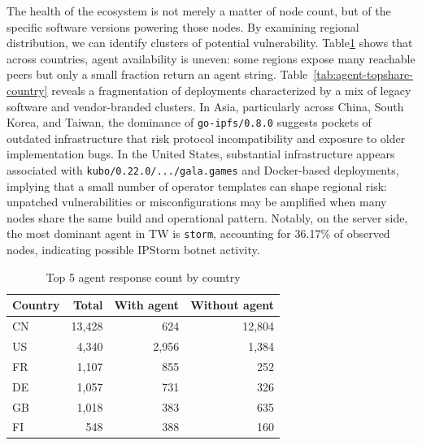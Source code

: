 \documentclass[10pt,a4paper,twocolumn]{article}
\begin{document}
The health of the ecosystem is not merely a matter of node count, but of the specific software versions powering those nodes. By examining regional distribution, we can identify clusters of potential vulnerability. Table\ref{tab:agent-coverage-country} shows that across countries, agent availability is uneven: some regions expose many reachable peers but only a small fraction return an agent string. Table~\ref{tab:agent-topshare-country} reveals a fragmentation of deployments characterized by a mix of legacy software and vendor-branded clusters. In Asia, particularly across China, South Korea, and Taiwan, the dominance of \texttt{go-ipfs/0.8.0} suggests pockets of outdated infrastructure that risk protocol incompatibility and exposure to older implementation bugs. In the United States, substantial infrastructure appears associated with \texttt{kubo/0.22.0/.../gala.games} and Docker-based deployments, implying that a small number of operator templates can shape regional risk: unpatched vulnerabilities or misconfigurations may be amplified when many nodes share the same build and operational pattern.
Notably, on the server side, the most dominant agent in TW is \texttt{storm}, accounting for 36.17\% of observed nodes, indicating possible IPStorm botnet activity.
\begin{table}[ht]
    \centering
    \caption{Top 5 agent response count by country}
    \label{tab:agent-coverage-country}
    \begin{tabular}{lrrr}
        \hline
        Country & Total & With agent & Without agent \\
        \hline
        CN & 13,428 & 624 & 12,804 \\
        US & 4,340 & 2,956 & 1,384 \\
        FR & 1,107 & 855 & 252 \\
        DE & 1,057 & 731 & 326 \\
        GB & 1,018 & 383 & 635 \\
        FI & 548 & 388 & 160 \\
        \hline
    \end{tabular}
\end{table}
\end{document}
